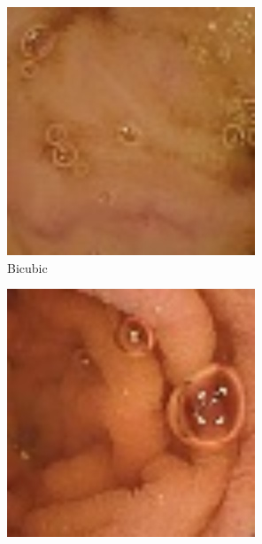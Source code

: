 \begin{figure}[H]
  \centering
  \begin{subfigure}[b]{0.275\textwidth}
    \includegraphics[width=\textwidth]{Chapter7/Bicubic_9.jpg}
    \caption{Bicubic}
  \end{subfigure}
  \begin{subfigure}[b]{0.275\textwidth}
    \includegraphics[width=\textwidth]{Chapter7/Bicubic_445.jpg}

\end{subfigure}
\end{figure}
